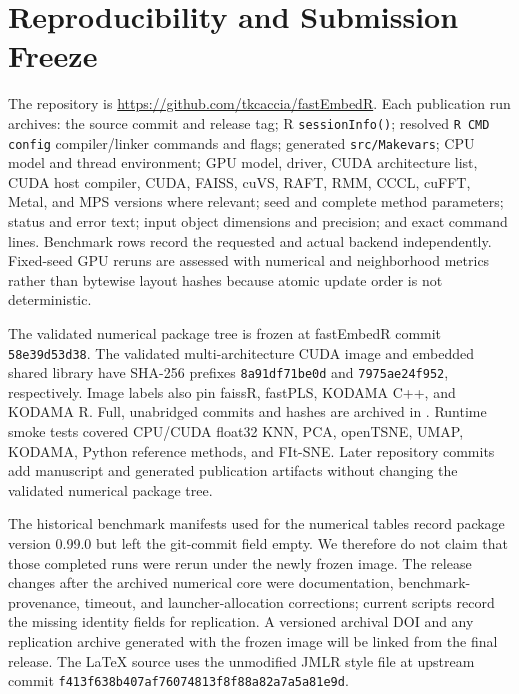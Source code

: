 \documentclass[twoside,11pt]{article}
\begin{document}
\clearpage
\section{Reproducibility and Submission Freeze}

The repository is \url{https://github.com/tkcaccia/fastEmbedR}. Each publication run archives: the source commit and release tag; R \texttt{sessionInfo()}; resolved \texttt{R CMD config} compiler/linker commands and flags; generated \texttt{src/Makevars}; CPU model and thread environment; GPU model, driver, CUDA architecture list, CUDA host compiler, CUDA, FAISS, cuVS, RAFT, RMM, CCCL, cuFFT, Metal, and MPS versions where relevant; seed and complete method parameters; status and error text; input object dimensions and precision; and exact command lines. Benchmark rows record the requested and actual backend independently. Fixed-seed GPU reruns are assessed with numerical and neighborhood metrics rather than bytewise layout hashes because atomic update order is not deterministic.

The validated numerical package tree is frozen at fastEmbedR commit
\texttt{58e39d53d38}. The validated multi-architecture CUDA image and embedded
shared library have SHA-256 prefixes \texttt{8a91df71be0d} and
\texttt{7975ae24f952}, respectively. Image labels also pin faissR, fastPLS,
KODAMA C++, and KODAMA R. Full, unabridged commits and hashes are archived in
. Runtime smoke tests covered CPU/CUDA
float32 KNN, PCA, openTSNE, UMAP, KODAMA, Python reference methods, and
FIt-SNE. Later repository commits add manuscript and generated publication
artifacts without changing the validated numerical package tree.

The historical benchmark manifests used for the numerical tables record package version 0.99.0 but left the git-commit field empty. We therefore do not claim that those completed runs were rerun under the newly frozen image. The release changes after the archived numerical core were documentation, benchmark-provenance, timeout, and launcher-allocation corrections; current scripts record the missing identity fields for replication. A versioned archival DOI and any replication archive generated with the frozen image will be linked from the final release. The LaTeX source uses the unmodified JMLR style file at upstream commit \texttt{f413f638b407af76074813f8f88a82a7a5a81e9d}.

\clearpage

\end{document}
